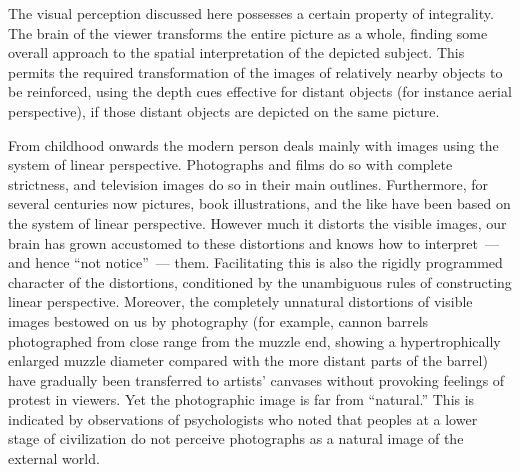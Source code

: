

The visual perception discussed here possesses a certain property of integrality.  The
brain of the viewer transforms the entire picture as a whole, finding some overall
approach to the spatial interpretation of the depicted subject.  This permits the required
transformation of the images of relatively nearby objects to be reinforced, using the
depth cues effective for distant objects (for instance aerial perspective), if those distant
objects are depicted on the same picture.

From childhood onwards the modern person deals mainly with images using the system
of linear perspective.  Photographs and films do so with complete strictness, and
television images do so in their main outlines.  Furthermore, for several centuries now
pictures, book illustrations, and the like have been based on the system of linear
perspective.  However much it distorts the visible images, our brain has grown
accustomed to these distortions and knows how to interpret~--- and hence ``not
notice''~--- them.  Facilitating this is also the rigidly programmed character of the
distortions, conditioned by the unambiguous rules of constructing linear perspective.
Moreover, the completely unnatural distortions of visible images bestowed on us by
photography (for example, cannon barrels photographed from close range from the
muzzle end, showing a hypertrophically enlarged muzzle diameter compared with the
more distant parts of the barrel) have gradually been transferred to artists' canvases
without provoking feelings of protest in viewers.  Yet the photographic image is far
from ``natural.''  This is indicated by observations of psychologists who noted that
peoples at a lower stage of civilization do not perceive photographs as a natural image
of the external world.


